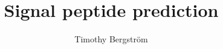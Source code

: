
\documentclass[a4paper]{article}  %

\usepackage[english]{babel}
\usepackage[utf8x]{inputenc}
\usepackage[T1]{fontenc}
\usepackage{float} %

\usepackage[a4paper,top=3cm,bottom=2cm,left=3cm,right=3cm,marginparwidth=1.75cm]{geometry}

\usepackage{amsmath}
\usepackage{graphicx}
\usepackage[colorinlistoftodos]{todonotes}
\usepackage[colorlinks=true, allcolors=blue]{hyperref}

\usepackage{fancyhdr}
\usepackage{lipsum}

\usepackage{comment} 

\usepackage{listings}
\lstset{
  columns=flexible,
  basicstyle=\small\ttfamily,
  mathescape=true,
  escapeinside=||
}	

\pagestyle{fancy}
\fancyhead{}
\fancyfoot{}
\fancyfoot[R]{\thepage}
\fancyfoot[L]{\date{\today}}




\title{\vspace{60mm} \bf 
Signal peptide prediction}  %
\author{Timothy Bergström}
\maketitle
\thispagestyle{fancy}  %
\newpage
\tableofcontents  %
\newpage

